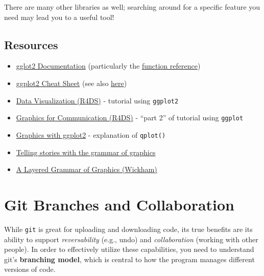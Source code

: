 \documentclass[]{book}
\providecommand{\tightlist}{%
  \setlength{\itemsep}{0pt}\setlength{\parskip}{0pt}}
\theoremstyle{definition}
\theoremstyle{definition}
\theoremstyle{remark}
\begin{document}
There are many other libraries as well; searching around for a specific
feature you need may lead you to a useful tool!

\section*{Resources}\label{resources-12}


\begin{itemize}
\tightlist
\item
  \href{http://ggplot2.tidyverse.org/}{gglot2 Documentation}
  (particularly the
  \href{http://ggplot2.tidyverse.org/reference/index.html}{function
  reference})
\item
  \href{https://www.rstudio.com/wp-content/uploads/2016/11/ggplot2-cheatsheet-2.1.pdf}{ggplot2
  Cheat Sheet} (see also
  \href{http://zevross.com/blog/2014/08/04/beautiful-plotting-in-r-a-ggplot2-cheatsheet-3/}{here})
\item
  \href{http://r4ds.had.co.nz/data-visualisation.html}{Data
  Visualization (R4DS)} - tutorial using \texttt{ggplot2}
\item
  \href{http://r4ds.had.co.nz/graphics-for-communication.html}{Graphics
  for Communication (R4DS)} - ``part 2'' of tutorial using
  \texttt{ggplot}
\item
  \href{http://www.statmethods.net/advgraphs/ggplot2.html}{Graphics with
  ggplot2} - explanation of \texttt{qplot()}
\item
  \href{https://codewords.recurse.com/issues/six/telling-stories-with-data-using-the-grammar-of-graphics}{Telling
  stories with the grammar of graphics}
\item
  \href{http://vita.had.co.nz/papers/layered-grammar.pdf}{A Layered
  Grammar of Graphics (Wickham)}
\end{itemize}

\hypertarget{git-branches}{\chapter{Git Branches and
Collaboration}\label{git-branches}}

While \texttt{git} is great for uploading and downloading code, its true
benefits are its ability to support \emph{reversability} (e.g., undo)
and \emph{collaboration} (working with other people). In order to
effectively utilize these capabilities, you need to understand git's
\textbf{branching model}, which is central to how the program manages
different versions of code.
\end{document}
